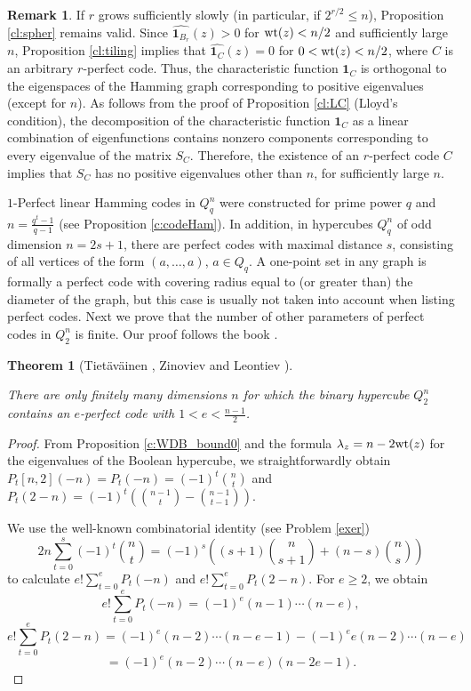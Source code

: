 \documentclass[11pt]{article}
\newtheorem{theorem}{Theorem}[section]
\theoremstyle{definition}
\newtheorem{remark}{Remark}[section]
\newcommand{\wt}{{\rm wt}}
\begin{document}
{{{\begin{remark}
If $r$ grows sufficiently slowly (in particular, if
$2^{r/2}\leq n$), Proposition \ref{cl:spher} remains valid. Since
$
\widehat{{\mathbf 1}_{B_r}}(z)>0$
for $\wt(z)<n/2$ and sufficiently large $n$, Proposition \ref{cl:tiling}
implies that
$
\widehat{{\mathbf 1}_C}(z)=0$
for $0<\wt(z)<n/2$, where $C$ is an arbitrary $r$-perfect code.
Thus, the characteristic function ${\mathbf 1}_C$ is orthogonal to the
eigenspaces of the Hamming graph corresponding to positive
eigenvalues (except for $n$).
As follows from the proof of Proposition \ref{cl:LC} (Lloyd's condition), the decomposition
of the characteristic function ${\mathbf 1}_C$ as a linear combination of
eigenfunctions contains nonzero components corresponding to every
eigenvalue of the matrix $S_C$. Therefore, the existence of an  $r$-perfect code $C$ implies that  $S_C$ has no positive eigenvalues other than $n$,   for sufficiently large
$n$.

\end{remark}

$1$-Perfect linear Hamming codes in $Q^n_q$ were
constructed for prime power $q$ and  $n=\frac{q^t-1}{q-1}$  (see Proposition \ref{c:codeHam}). In addition, in hypercubes $Q_q^n$ of odd dimension
$n=2s+1$, there are perfect codes with maximal
distance $s$, consisting of all vertices of the form
$(a,\dots,a)$, $a\in Q_q$. A
one-point set in any graph is formally a perfect code with covering
radius equal to (or greater than) the diameter of the graph, but this
case is usually not taken into account when listing perfect codes. Next we prove that the number of other parameters of perfect codes in $Q^n_2$  is finite. Our proof follows the book
\cite{Lint}.


\begin{theorem}[Tiet\"av\"ainen \cite{Tiet}, Zinoviev and Leontiev
\cite{ZL72}]\label{th:percod}

There are only finitely many dimensions $n$ for which the binary
hypercube $Q^n_2$ contains an $e$-perfect code with
$1<e<\frac{n-1}{2}$.

\end{theorem}

\begin{proof}

From Proposition \ref{c:WDB_bound0} and the formula
$\lambda_z=n-2\wt(z)$ for the eigenvalues of  the
Boolean  hypercube, we straightforwardly obtain
$P_t[n,2](-n)=P_t(-n)=(-1)^t{n\choose t}$ and
$P_t(2-n)=(-1)^t\left({n-1\choose t}-
{n-1\choose t-1}\right)$.

We use the well-known combinatorial identity (see Problem
\ref{exer})
\[
2n\sum\limits_{t=0}^s(-1)^{t}{n \choose t}
=(-1)^{s}\left((s+1){n \choose {s+1}}
+(n-s){n \choose {s}}\right)
\]
to calculate $e!\sum\limits_{t=0}^eP_t(-n)$ and
$e!\sum\limits_{t=0}^eP_t(2-n)$. For $e\geq 2$, we obtain
\[
e!\sum\limits_{t=0}^eP_t(-n)
=(-1)^e(n-1)\cdots(n-e),
\]
\[
e!\sum\limits_{t=0}^eP_t(2-n)
=(-1)^e(n-2)\cdots(n-e-1)
-(-1)^ee(n-2)\cdots(n-e)
\]
\[
=(-1)^e(n-2)\cdots(n-e)(n-2e-1).
\]


\end{proof}}}}
\end{document}
